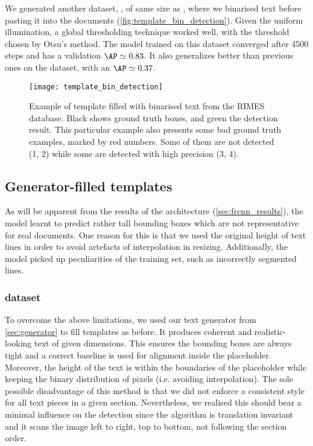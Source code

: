 			We generated another dataset, , of same size as , where we binarised text before pasting it into the documents (\autoref{fig:template_bin_detection}). Given the uniform illumination, a global thresholding technique worked well, with the threshold chosen by Otsu's method. The model trained on this dataset converged after 4500 steps and has a validation \(\AP \simeq 0.83 \). It also generalizes better than previous ones on the  dataset, with an \(\AP \simeq 0.37\).

			\begin{figure}
				\texttt{[image: template\_bin\_detection]}
				\caption[ example]{Example of template filled with binarised text from the RIMES database. Black shows ground truth boxes, and green the detection result. This particular example also presents some bad ground truth examples, marked by red numbers. Some of them are not detected (1, 2) while some are detected with high precision (3, 4). }
				\label{fig:template_bin_detection}
			\end{figure}

	\subsection{Generator-filled templates}
		As will be apparent from the results of the \FRCNN{} architecture (\autoref{sec:frcnn_results}), the model learnt to predict rather tall bounding boxes which are not representative for real documents. One reason for this is that we used the original height of text lines in order to avoid artefacts of interpolation in resizing. Additionally, the model picked up peculiarities of the training set, such as incorrectly segmented lines.


		\subsubsection*{ dataset}

			To overcome the above limitations, we used our text generator from \autoref{sec:generator} to fill templates as before. It produces coherent and realistic-looking text of given dimensions. This ensures the bounding boxes are always tight and a correct baseline is used for alignment inside the placeholder. Moreover, the height of the text is within the boundaries of the placeholder while keeping the binary distribution of pixels (i.e. avoiding interpolation). The sole possible disadvantage of this method is that we did not enforce a consistent style for all text pieces in a given section. Nevertheless, we realised this should bear a minimal influence on the detection since the algorithm is translation invariant and it scans the image left to right, top to bottom, not following the section order.


